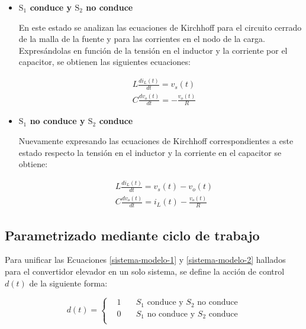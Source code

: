 \begin{itemize}
    \item \textbf{$\boldsymbol{\mathrm{S_1}}$ conduce y $\boldsymbol{\mathrm{S_2}}$ no conduce}
    
    En este estado se analizan las ecuaciones de Kirchhoff para el circuito cerrado de la malla de la fuente y para las corrientes en el nodo de la carga. Expresándolas en función de la tensión en el inductor y la corriente por el capacitor, se obtienen las siguientes ecuaciones:

    \begin{equation}
        \begin{split}
          & L \frac{di_L(t)}{dt} = v_s(t) 
          \\
          & C \frac{dv_o(t)}{dt} = - \frac{v_o(t)}{R}
        \end{split}
        \label{sistema-modelo-1}
      \end{equation}

      \item \textbf{$\boldsymbol{\mathrm{S_1}}$ no conduce y $\boldsymbol{\mathrm{S_2}}$ conduce}
      
      Nuevamente expresando las ecuaciones de Kirchhoff correspondientes a este estado respecto la tensión en el inductor y la corriente en el capacitor se obtiene:
      
    \begin{equation}
        \begin{split}
          & L \frac{di_L(t)}{dt} = v_s(t) - v_o(t)
          \\
          & C \frac{dv_o(t)}{dt} = i_L(t)- \frac{v_o(t)}{R}
        \end{split}
        \label{sistema-modelo-2}
      \end{equation}
\end{itemize}

\subsection{Parametrizado mediante ciclo de trabajo}

Para unificar las Ecuaciones \ref{sistema-modelo-1} y \ref{sistema-modelo-2} hallados para el convertidor elevador en un solo sistema, se define la acción de control $d(t)$ de la siguiente forma:

\[
  d(t) = \left\{\begin{alignedat}{2}
    & 1 &\quad  \text{$S_1$ conduce y $S_2$ no conduce} \\
    & 0 &\quad  \text{$S_1$ no conduce y $S_2$ conduce} \\
  \end{alignedat}\right.
\]

